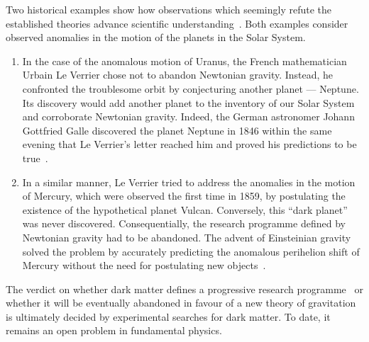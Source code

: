 Two historical examples show how observations which seemingly refute the established theories advance scientific understanding~\cite{Bertone2005}. Both examples consider observed anomalies in the motion of the planets in the Solar System.
\begin{enumerate}
    \item In the case of the anomalous motion of Uranus, the French mathematician Urbain Le Verrier chose not to abandon Newtonian gravity. Instead, he confronted the troublesome orbit by conjecturing another planet --- Neptune. Its discovery would add another planet to the inventory of our Solar System and corroborate Newtonian gravity. Indeed, the German astronomer Johann Gottfried Galle discovered the planet Neptune in 1846 within the same evening that Le Verrier's letter reached him and proved his predictions to be true~\cite{Galle1846,Leverrier1910}.
    \item In a similar manner, Le Verrier tried to address the anomalies in the motion of Mercury, which were observed the first time in 1859, by postulating the existence of the hypothetical planet Vulcan. Conversely, this ``dark planet'' was never discovered. Consequentially, the research programme defined by Newtonian gravity had to be abandoned. The advent of Einsteinian gravity solved the problem by accurately predicting the anomalous perihelion shift of Mercury without the need for postulating new objects~\cite{Clemence1947}.
\end{enumerate}

The verdict on whether dark matter defines a progressive research programme~\cite{Lakatos1976} or whether it will be eventually abandoned in favour of a new theory of gravitation is ultimately decided by experimental searches for dark matter. To date, it remains an open problem in fundamental physics.


